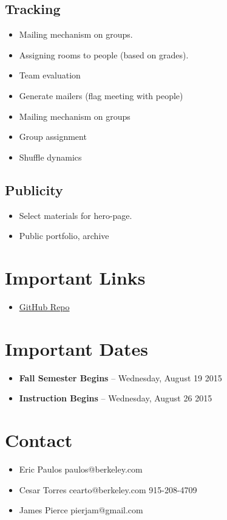 \documentclass[12pt]{article} %
\begin{document}
\subsection{Tracking}
\begin{itemize}
\item Mailing mechanism on groups.
\item Assigning rooms to people (based on grades).
\item Team evaluation
\item Generate mailers (flag meeting with people)
\item Mailing mechanism on groups
\item Group assignment 
\item Shuffle dynamics
\end{itemize}

\subsection{Publicity}
\begin{itemize}
\item Select materials for hero-page. 
\item Public portfolio, archive
\end{itemize}

\section{Important Links}
\begin{itemize}
\item \href{https://github.com/cs160-fall2015/course-development}{GitHub Repo}
\end{itemize}
\section{Important Dates}
\begin{itemize}
\item \textbf{Fall Semester Begins} -- Wednesday, August 19 2015
\item \textbf{Instruction Begins} -- Wednesday, August 26 2015
\end{itemize}


\section{Contact}
\begin{itemize}
	\item Eric Paulos paulos@berkeley.com
	\item Cesar Torres cearto@berkeley.com  915-208-4709
	\item James Pierce pierjam@gmail.com
\end{itemize}
\end{document}

